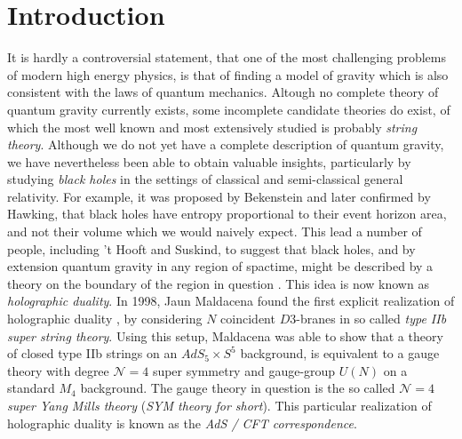 %
\section{Introduction}
It is hardly a controversial statement, that one of the most challenging problems of modern high energy physics, is that of finding a model of gravity which is also consistent with the laws of quantum mechanics. Altough no complete theory of quantum gravity currently exists, some incomplete candidate theories do exist, of which the most well known and most extensively studied is probably \textit{string theory}. Although we do not yet have a complete description of quantum gravity, we have nevertheless been able to obtain valuable insights, particularly by studying \textit{black holes} in the settings of classical and semi-classical general relativity. For example, it was proposed by Bekenstein and later confirmed by Hawking, that black holes have entropy proportional to their event horizon area, and not their volume which we would naively expect. This lead a number of people, including 't Hooft and Suskind, to suggest that black holes, and by extension quantum gravity in any region of spactime, might be described by a theory on the boundary of the region in question \cite{Holography Suskind}. This idea is now known as \textit{holographic duality}. In 1998, Jaun Maldacena found the first explicit realization of holographic duality \cite{AdS/CFT Maldacena}, by considering $N$ coincident $D3$-branes in so called \textit{type IIb super string theory}. Using this setup, Maldacena was able to show that a theory of closed type IIb strings on an $AdS_5 \times S^5$ background, is equivalent to a gauge theory with degree $\mathcal{N}=4$ super symmetry and gauge-group $U(N)$ on a standard $M_4$ background. The gauge theory in question is the so called $\mathcal{N}=4$ \textit{super Yang Mills theory} (\textit{SYM theory for short}). This particular realization of holographic duality is known as the \textit{AdS / CFT correspondence}.\\
